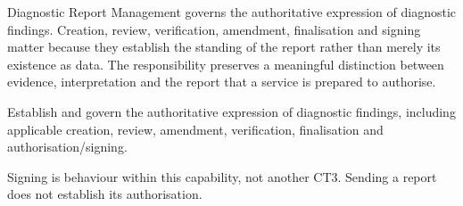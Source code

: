 Diagnostic Report Management governs the authoritative expression of diagnostic findings. Creation, review, verification, amendment, finalisation and signing matter because they establish the standing of the report rather than merely its existence as data. The responsibility preserves a meaningful distinction between evidence, interpretation and the report that a service is prepared to authorise.



Establish and govern the authoritative expression of diagnostic findings, including applicable creation, review, amendment, verification, finalisation and authorisation/\allowbreak{}signing.



Signing is behaviour within this capability, not another CT3. Sending a report does not establish its authorisation.


